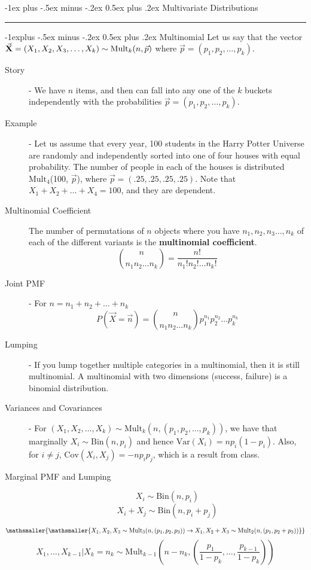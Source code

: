 \documentclass[10pt,landscape]{article}
\makeatletter
\newcommand{\var}{\textrm{Var}}
\newcommand{\cov}{\textrm{Cov}}
\newcommand{\Bin}{\textrm{Bin}}
\newcommand{\Mult}{\textrm{Mult}}
\renewcommand{\section}{\@startsection{section}{1}{0mm}%
                                {-1ex plus -.5ex minus -.2ex}%
                                {0.5ex plus .2ex}%
                                {\normalfont\large\bfseries}}
\renewcommand{\subsection}{\@startsection{subsection}{2}{0mm}%
                                {-1explus -.5ex minus -.2ex}%
                                {0.5ex plus .2ex}%
                                {\normalfont\normalsize\bfseries}}
\makeatother
\begin{document}
\begin{multicols}{3}
\section{Multivariate Distributions} \smallskip \hrule height 2pt \smallskip


\subsection{Multinomial}
    Let us say that the vector $\vec{\textbf{X}} = (X_1, X_2, X_3, \dots, X_k) \sim \textnormal{Mult}_k(n, \vec{p})$  where $\vec{p} = (p_1, p_2, \dots, p_k)$.
\begin{description}
    \item[Story] - We have $n$ items, and then can fall into any one of the $k$ buckets independently with the probabilities $\vec{p} = (p_1, p_2, \dots, p_k)$.
    \item[Example] - Let us assume that every year, 100 students in the Harry Potter Universe are randomly and independently sorted into one of four houses with equal probability. The number of people in each of the houses is distributed $\Mult_4$(100, $\vec{p}$), where $\vec{p} = (.25, .25, .25, .25)$.
        Note that $X_1 + X_2 + \dots + X_4 = 100$, and they are dependent.
    \item[Multinomial Coefficient] The number of permutations of $n$ objects where you have $n_1, n_2, n_3 \dots, n_k$ of each of the different variants is the \textbf{multinomial coefficient}.
        \[{n \choose n_1n_2\dots n_k} = \frac{n!}{n_1!n_2!\dots n_k!}\]
    \item[Joint PMF] - For $n = n_1 + n_2 + \dots + n_k$
        \[P(\vec{X} = \vec{n}) = {n \choose n_1n_2\dots n_k}p_1^{n_1}p_2^{n_2}\dots p_k^{n_k}\]
    \item[Lumping] - If you lump together multiple categories in a multinomial, then it is still multinomial. A multinomial with two dimensions (success, failure) is a binomial distribution.
    \item[Variances and Covariances] - For $(X_1, X_2, \dots, X_k) \sim \Mult_k(n, (p_1, p_2, \dots, p_k))$, we have that marginally $X_i \sim \Bin(n, p_i)$ and hence $\var(X_i) = np_i(1-p_i)$. Also, for $i\neq j$, $\cov(X_i, X_j) = -np_ip_j$, which is a result from class.
    \item[Marginal PMF and Lumping]
        \[X_i \sim \Bin(n, p_i)\]
        \[X_i + X_j \sim \Bin(n, p_i + p_j)\]
\end{description}
        \[\mathsmaller{\mathsmaller{X_1, X_2, X_3 \sim \Mult_3(n, (p_1, p_2, p_3)) \rightarrow X_1, X_2 + X_3 \sim \Mult_2(n, (p_1, p_2 + p_3))}}\]
        \[X_1, \dots, X_{k-1} | X_k = n_k \sim \Mult_{k-1}\left(n - n_k, \left(\frac{p_1}{1 - p_k}, \dots, \frac{p_{k-1}}{1 - p_k}\right)\right)\]


\end{multicols}
\end{document}
